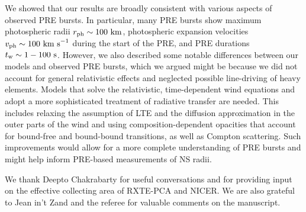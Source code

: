 \documentclass[apj,usenatbib, iop, twocolappendix]{emulateapj}
\newcommand{\trm}[1]{\textrm{#1}}
\begin{document}
We showed that our results are broadly consistent with various aspects of observed PRE bursts.  In particular, many PRE bursts show maximum photospheric radii $r_{\rm ph}\sim 100\trm{ km}$, photospheric expansion velocities $v_{\rm ph}\sim 100\trm{ km s}^{-1}$ during the start of the PRE, and PRE durations $t_{\rm w}\sim 1-100\trm{ s}$.  However, we also described some notable differences between our models and observed PRE bursts, which we argued might be because we did not account for general relativistic effects and neglected possible line-driving of heavy elements.  Models that solve the relativistic, time-dependent wind equations and adopt a more sophisticated treatment of radiative transfer are needed.  This includes relaxing the assumption of LTE and the diffusion approximation in the outer parts of the wind and using composition-dependent opacities that account for bound-free and bound-bound transitions, as well as Compton scattering. Such improvements would allow for a more complete understanding of PRE bursts and might help inform PRE-based measurements of NS radii.




\acknowledgments

We thank Deepto Chakrabarty for useful conversations and for providing input on the effective collecting area of  RXTE-PCA and NICER. We are also grateful to Jean in't Zand and the referee for valuable comments on the manuscript.

\end{document}
